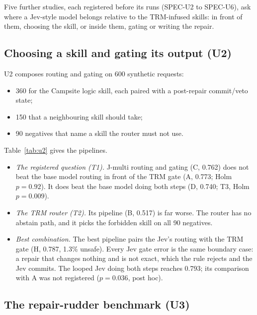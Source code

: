 \documentclass[11pt]{article}
\begin{document}
Five further studies, each registered before its runs (SPEC-U2 to SPEC-U6), ask where a Jev-style
model belongs relative to the TRM-infused skills: in front of them, choosing the skill, or inside
them, gating or writing the repair.

\subsection{Choosing a skill and gating its output (U2)}

U2 composes routing and gating on 600 synthetic requests:
\begin{itemize}
  \item 360 for the Campsite logic skill, each paired with a post-repair commit/veto state;
  \item 150 that a neighbouring skill should take;
  \item 90 negatives that name a skill the router must not use.
\end{itemize}
Table~\ref{tab:u2} gives the pipelines.
\begin{itemize}
  \item \emph{The registered question (T1).} J-multi routing and gating (C, 0.762) does not beat
  the base model routing in front of the TRM gate (A, 0.773; Holm $p=0.92$). It does beat the base
  model doing both steps (D, 0.740; T3, Holm $p=0.009$).
  \item \emph{The TRM router (T2).} Its pipeline (B, 0.517) is far worse. The router has no
  abstain path, and it picks the forbidden skill on all 90 negatives.
  \item \emph{Best combination.} The best pipeline pairs the Jev's routing with the TRM gate (H,
  0.787, 1.3\% unsafe). Every Jev gate error is the same boundary case: a repair that changes
  nothing and is not exact, which the rule rejects and the Jev commits. The looped Jev doing both
  steps reaches 0.793; its comparison with A was not registered ($p=0.036$, post hoc).
\end{itemize}

\begin{table}[t]
\centering
\small

\caption{SPEC-U2: end-to-end success and unsafe rate (a commit on a gold reject after correct
routing, or the forbidden skill chosen) on 600 synthetic requests. Number of instances (seeds) in
brackets. Generated from the run records.}
\label{tab:u2}
\end{table}

\subsection{The repair-rudder benchmark (U3)}
\end{document}
